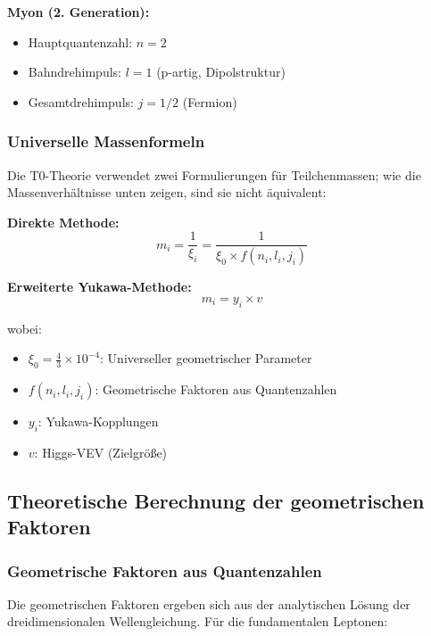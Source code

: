 \textbf{Myon (2. Generation):}
\begin{itemize}
	\item Hauptquantenzahl: $n = 2$
	\item Bahndrehimpuls: $l = 1$ (p-artig, Dipolstruktur)
	\item Gesamtdrehimpuls: $j = 1/2$ (Fermion)
\end{itemize}

\subsubsection{Universelle Massenformeln}

Die T0-Theorie verwendet zwei Formulierungen für Teilchenmassen; wie die Massenverhältnisse unten zeigen, sind sie nicht äquivalent:

\textbf{Direkte Methode:}
\begin{equation}
	m_i = \frac{1}{\xi_i} = \frac{1}{\xi_0 \times f(n_i, l_i, j_i)}
	\label{eq:direct_mass_formula}
\end{equation}

\textbf{Erweiterte Yukawa-Methode:}
\begin{equation}
	m_i = y_i \times v
	\label{eq:yukawa_mass_formula}
\end{equation}

wobei:
\begin{itemize}
	\item $\xi_0 = \frac{4}{3} \times 10^{-4}$: Universeller geometrischer Parameter
	\item $f(n_i, l_i, j_i)$: Geometrische Faktoren aus Quantenzahlen
	\item $y_i$: Yukawa-Kopplungen
	\item $v$: Higgs-VEV (Zielgröße)
\end{itemize}

\subsection{Theoretische Berechnung der geometrischen Faktoren}

\subsubsection{Geometrische Faktoren aus Quantenzahlen}

Die geometrischen Faktoren ergeben sich aus der analytischen Lösung der dreidimensionalen Wellengleichung. Für die fundamentalen Leptonen:

